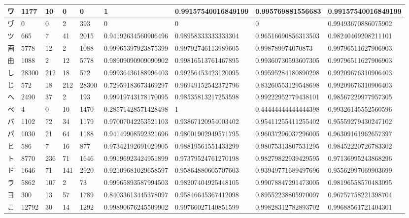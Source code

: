 \begin{table}[H]
\begin{center}
\begin{CJK}{UTF8}{min}
\begin{tabular}{ | l | l | l | l | l | l | l | l | l | }
			ワ & 1177 & 10 & 0 & 0 & 1 & 0.99157540016849199 & 0.995769881556683 & 0.99157540016849199 \\ \hline
			ヷ & 0 & 0 & 2 & 393 & 0 & 0 & 0 & 0.99493670886075902 \\ \hline
			ツ & 665 & 7 & 41 & 2015 & 0.94192634560906496 & 0.98958333333333304 & 0.96516690856313503 & 0.98240469208211101 \\ \hline
			画 & 5778 & 12 & 2 & 1088 & 0.99965397923875399 & 0.99792746113989605 & 0.998789974070873 & 0.99796511627906903 \\ \hline
			由 & 1088 & 2 & 12 & 5778 & 0.98909090909090902 & 0.99816513761467895 & 0.99360730593607305 & 0.99796511627906903 \\ \hline
			し & 28300 & 212 & 18 & 572 & 0.99936436188996403 & 0.99256453423120095 & 0.99595284180890298 & 0.99209676310906403 \\ \hline
			じ & 572 & 18 & 212 & 28300 & 0.72959183673469297 & 0.96949152542372796 & 0.83260553129548698 & 0.99209676310906403 \\ \hline
			へ & 2490 & 37 & 2 & 193 & 0.99919743178170095 & 0.98535813217253598 & 0.99222952779438101 & 0.98567229977957305 \\ \hline
			ぺ & 4 & 0 & 10 & 1470 & 0.28571428571428498 & 1 & 0.44444444444444398 & 0.99326145552560596 \\ \hline
			バ & 1102 & 72 & 34 & 1179 & 0.97007042253521103 & 0.93867120954003402 & 0.95411255411255402 & 0.95559279430247102 \\ \hline
			パ & 1030 & 21 & 64 & 1188 & 0.94149908592321696 & 0.98001902949571795 & 0.96037296037296005 & 0.96309161962657397 \\ \hline
			ヒ & 586 & 7 & 16 & 877 & 0.97342192691029905 & 0.98819561551433299 & 0.98075313807531295 & 0.98452220726783302 \\ \hline
			ト & 8770 & 236 & 71 & 1646 & 0.99196923424951899 & 0.97379524761270198 & 0.98279822939429595 & 0.97136995243868296 \\ \hline
			ド & 1646 & 71 & 141 & 2920 & 0.92109681029658597 & 0.95864880605707603 & 0.93949771689497696 & 0.95562997069903699 \\ \hline
			ラ & 5862 & 107 & 2 & 73 & 0.99965893587994503 & 0.98207404925448105 & 0.99078847291473005 & 0.98196558570483095 \\ \hline
			ヨ & 300 & 13 & 57 & 1789 & 0.84033613445378097 & 0.95846645367412098 & 0.89552238805970097 & 0.96757758221398704 \\ \hline
			こ & 12792 & 30 & 14 & 1292 & 0.99890676245509902 & 0.99766027140851599 & 0.99828312782893702 & 0.99688561721404301 \\ \hline

\end{tabular}
\end{CJK}
\end{center}
\end{table}
